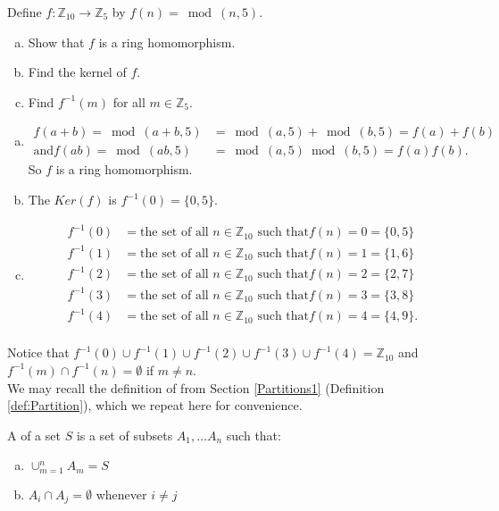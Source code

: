 \begin{example}
Define $f: {\mathbb Z}_{10}\rightarrow {\mathbb Z}_5$ by $f(n)=\bmod(n,5)$.
\begin{enumerate}[(a)]
\item Show that $f$ is a ring homomorphism.
\item Find the kernel of $f$.
\item Find $f^{-1}(m)$ for all $m\in{\mathbb Z}_5$.
\end{enumerate}

\begin{enumerate}[(a)]
\item 
\begin{align*}
f(a+b)=\bmod(a+b,5)&=\bmod(a,5)+\bmod(b,5)=f(a)+f(b) \\
\text{and} f(ab)=\bmod(ab,5)&=\bmod(a,5)\bmod(b,5)=f(a)f(b).
\end{align*}
So $f$ is a ring homomorphism.

\item The $Ker(f)$ is $f^{-1}(0)=\{0,5\}$.\\

\item
\begin{align*}
f^{-1}(0)&=\text{the set of all $n\in{\mathbb Z}_{10}$ such that} f(n)=0=\{0,5\} \\
f^{-1}(1)&=\text{the set of all $n\in{\mathbb Z}_{10}$ such that} f(n)=1=\{1,6\} \\
f^{-1}(2)&=\text{the set of all $n\in{\mathbb Z}_{10}$ such that} f(n)=2=\{2,7\} \\
f^{-1}(3)&=\text{the set of all $n\in{\mathbb Z}_{10}$ such that} f(n)=3=\{3,8\} \\
f^{-1}(4)&=\text{the set of all $n\in{\mathbb Z}_{10}$ such that} f(n)=4=\{4,9\}. \\
\end{align*}
\end{enumerate}

Notice that $f^{-1}(0)\cup f^{-1}(1)\cup f^{-1}(2)\cup f^{-1}(3)\cup f^{-1}(4)={\mathbb Z}_{10}$ and $f^{-1}(m)\cap f^{-1}(n)=\emptyset$ if $m\neq n$.\\
We may recall the definition of  from Section \ref{Partitions1} 
(Definition \ref{def:Partition}), which we repeat here for convenience.

\begin{defn}\label{partition}
A  of a set $S$ is a set of subsets $A_1,\dots A_n$ such that:
\begin{enumerate}[(a)]
\item $\cup_{m=1}^n A_m=S$
\item $A_i\cap A_j=\emptyset$ whenever $i\neq j$
\end{enumerate}
\end{defn}


\end{example}
